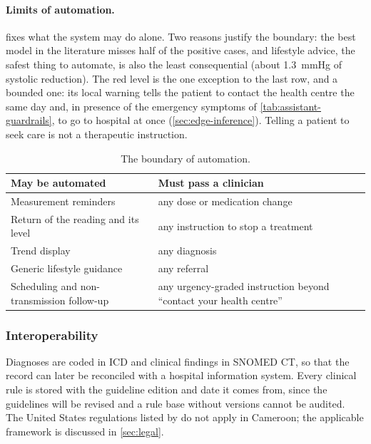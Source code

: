 \paragraph{Limits of automation.}  fixes what the system may do alone. Two reasons justify the boundary: the best model in the literature misses half of the positive cases, and lifestyle advice, the safest thing to automate, is also the least consequential (about 1.3~mmHg of systolic reduction). The red level is the one exception to the last row, and a bounded one: its local warning tells the patient to contact the health centre the same day and, in presence of the emergency symptoms of \cref{tab:assistant-guardrails}, to go to hospital at once (\cref{sec:edge-inference}). Telling a patient to seek care is not a therapeutic instruction.

\begin{table}[htbp]
\centering\small
\caption{The boundary of automation.}\label{tab:automation-boundary}
\begin{tabularx}{\textwidth}{@{}X X@{}}
\toprule
\textbf{May be automated} & \textbf{Must pass a clinician} \\
\midrule
Measurement reminders & any dose or medication change \\
Return of the reading and its level & any instruction to stop a treatment \\
Trend display & any diagnosis \\
Generic lifestyle guidance & any referral \\
Scheduling and non-transmission follow-up & any urgency-graded instruction beyond ``contact your health centre'' \\
\bottomrule
\end{tabularx}
\end{table}

\subsubsection{Interoperability}\label{sec:interop}

Diagnoses are coded in ICD and clinical findings in SNOMED CT, so that the record can later be reconciled with a hospital information system. Every clinical rule is stored with the guideline edition and date it comes from, since the guidelines will be revised and a rule base without versions cannot be audited. The United States regulations listed by \textcite{liu2025review} do not apply in Cameroon; the applicable framework is discussed in \cref{sec:legal}.

